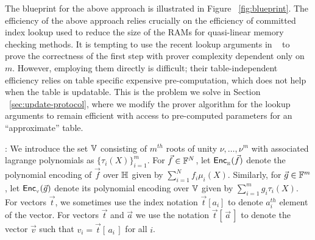 The blueprint for the above approach is illustrated in Figure ~\ref{fig:blueprint}.
The efficiency of the above approach relies crucially on the efficiency of committed index lookup used to
reduce the size of the RAMs for quasi-linear memory checking methods. It is tempting to use the recent lookup arguments
in ~\cite{CCS:ZBKMNS22,EPRINT:PosKat22,EPRINT:EagFioGab22} to prove the correctness of the first step with prover complexity dependent only on $m$.
However, employing them directly is difficult; their table-independent efficiency relies on
table specific expensive pre-computation, which does not help when the table is updatable. This is the problem we solve
in Section ~\ref{sec:update-protocol}, where we modify the prover algorithm for the lookup arguments to remain efficient
with access to pre-computed parameters for an ``approximate'' table.

:
We introduce the set $\mathbb{V}$ consisting of $m^{th}$ roots of unity
$\nu,\ldots,\nu^m$ with associated lagrange polynomials as $\{\tau_i(X)\}_{i=1}^m$. For $\vec{f}\in \mathbb{F}^N$, let
$\mathsf{Enc}_{{}_{\mathbb{H}}}(\vec{f})$ denote the polynomial encoding of $\vec{f}$ over $\mathbb{H}$ given by $\sum_{i=1}^N f_i\mu_i(X)$. Similarly,
for $\vec{g}\in \mathbb{F}^m$, let $\mathsf{Enc}_{{}_{\mathbb{V}}}(\vec{g})$ denote its polynomial encoding over $\mathbb{V}$ given by $\sum_{i=1}^m g_i\tau_i(X)$. 
For vectors $\vec{t}$, we sometimes use the index notation $\vec{t}[a_i]$ to denote $a_i^{th}$ element of the vector. For vectors
$\vec{t}$ and $\vec{a}$ we use the notation $\vec{t}[\,\vec{a}\,]$ to denote the vector $\vec{v}$ such that $v_i=\vec{t}[\,a_i\,]$ for all $i$.


